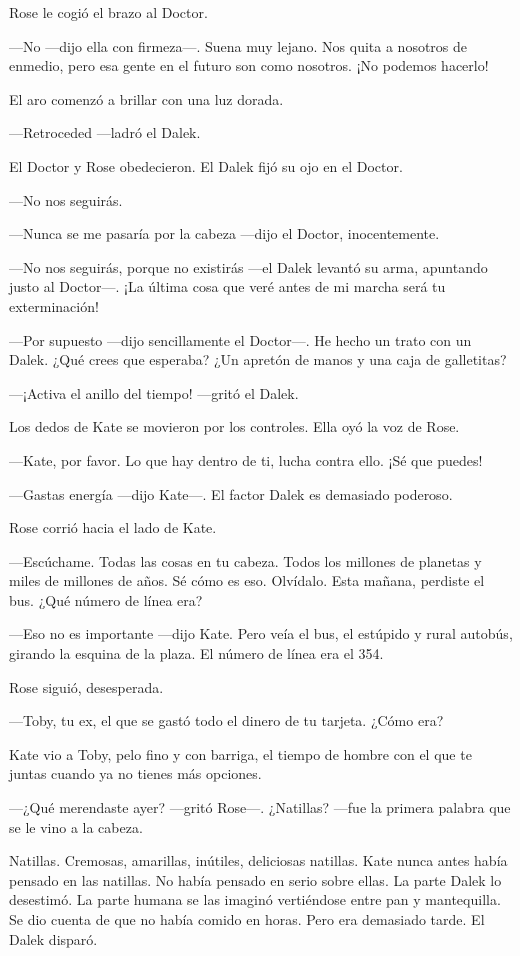 Rose le cogió el brazo al Doctor.

---No ---dijo ella con firmeza---. Suena muy lejano. Nos quita a nosotros
de enmedio, pero esa gente en el futuro son como nosotros. ¡No podemos
hacerlo!

El aro comenzó a brillar con una luz dorada.

---Retroceded ---ladró el Dalek.

El Doctor y Rose obedecieron. El Dalek fijó su ojo en el Doctor.

---No nos seguirás.

---Nunca se me pasaría por la cabeza ---dijo el Doctor, inocentemente.

---No nos seguirás, porque no existirás ---el Dalek levantó su arma,
apuntando justo al Doctor---. ¡La última cosa que veré antes de mi marcha
será tu exterminación!

---Por supuesto ---dijo sencillamente el Doctor---. He hecho un trato con
un Dalek. ¿Qué crees que esperaba? ¿Un apretón de manos y una caja de
galletitas?

---¡Activa el anillo del tiempo! ---gritó el Dalek.

Los dedos de Kate se movieron por los controles. Ella oyó la voz de
Rose.

---Kate, por favor. Lo que hay dentro de ti, lucha contra ello. ¡Sé que
puedes!

---Gastas energía ---dijo Kate---. El factor Dalek es demasiado poderoso.

Rose corrió hacia el lado de Kate.

---Escúchame. Todas las cosas en tu cabeza. Todos los millones de
planetas y miles de millones de años. Sé cómo es eso. Olvídalo. Esta
mañana, perdiste el bus. ¿Qué número de línea era?

---Eso no es importante ---dijo Kate. Pero veía el bus, el estúpido y
rural autobús, girando la esquina de la plaza. El número de línea era el
354.

Rose siguió, desesperada.

---Toby, tu ex, el que se gastó todo el dinero de tu tarjeta. ¿Cómo era?

Kate vio a Toby, pelo fino y con barriga, el tiempo de hombre con el que
te juntas cuando ya no tienes más opciones.

---¿Qué merendaste ayer? ---gritó Rose---. ¿Natillas? ---fue la primera
palabra que se le vino a la cabeza.

Natillas. Cremosas, amarillas, inútiles, deliciosas natillas. Kate nunca
antes había pensado en las natillas. No había pensado en serio sobre
ellas. La parte Dalek lo desestimó. La parte humana se las imaginó
vertiéndose entre pan y mantequilla. Se dio cuenta de que no había
comido en horas. Pero era demasiado tarde. El Dalek disparó.

